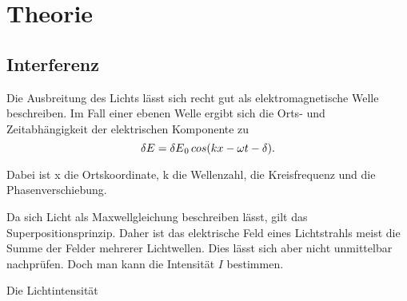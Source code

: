 \section{Theorie}
\label{sec:Theorie}

\subsection{Interferenz}

Die Ausbreitung des Lichts lässt sich recht gut als elektromagnetische Welle beschreiben. Im Fall einer ebenen Welle ergibt sich die Orts- und Zeitabhängigkeit der elektrischen Komponente zu 
\begin{equation}
    \var{E}= \var{E}_0 cos(kx - \omega t - \delta).
\end{equation}

Dabei ist x die Ortskoordinate, k die Wellenzahl, \omega die Kreisfrequenz und \delta die Phasenverschiebung. 

Da sich Licht als Maxwellgleichung beschreiben lässt, gilt das Superpositionsprinzip. Daher ist das elektrische Feld eines Lichtstrahls meist die Summe der Felder mehrerer Lichtwellen.
Dies lässt sich aber nicht unmittelbar nachprüfen. 
Doch man kann die Intensität $I$ bestimmen. 

Die Lichtintensität 
